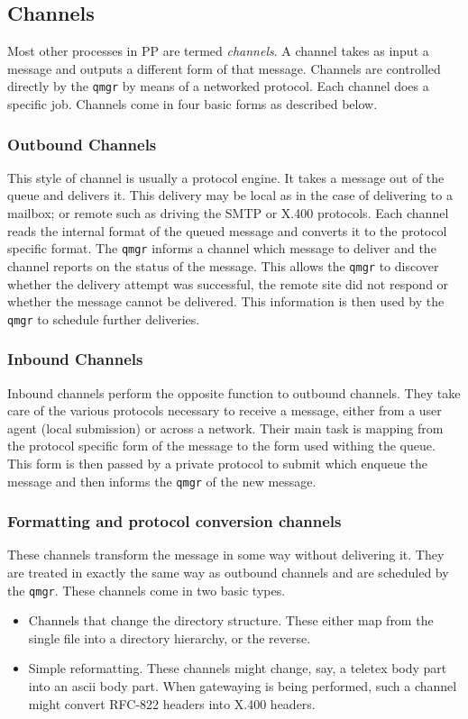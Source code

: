 \subsection{Channels}

Most other processes in PP are termed {\em channels}. A channel takes
as input a message and outputs a different form of that message.
Channels are controlled directly by the \verb|qmgr| by means of a networked
protocol. Each channel does a specific job. Channels come in four
basic forms as described below.

\subsubsection{Outbound Channels}
This style of channel is usually a protocol engine. It takes a message
out of the queue and delivers it. This delivery may be local as in the
case of delivering to a mailbox; or remote such as driving the
SMTP\cite{SMTP} or X.400 protocols. Each channel reads the internal
format of the queued message and converts it to the protocol specific
format. The \verb|qmgr| informs a channel which message to deliver and the
channel reports on the status of the message. This allows the \verb|qmgr| to
discover whether the delivery attempt was successful, the remote site
did not respond or whether the message cannot be delivered. This
information is then used by the \verb|qmgr| to schedule further deliveries.

\subsubsection{Inbound Channels}
Inbound channels perform the opposite function to outbound channels.
They take care of the various protocols necessary to receive a
message, either from a user agent (local submission) or across a
network. Their main task is mapping from the protocol specific form of
the message to the form used withing the queue. This form is then
passed by a private protocol to submit which enqueue the message and
then informs the \verb|qmgr| of the new message.

\subsubsection{Formatting and protocol conversion channels}
These channels transform the message in some way without delivering
it. They are treated in exactly the same way as outbound channels and
are scheduled by the \verb|qmgr|. These channels come in two basic types.
\begin{itemize}
\item	Channels that change the directory structure. These either map
from the single file into a directory hierarchy, or the reverse.

\item	Simple reformatting. These channels might change, say, a teletex
body part into an ascii body part. When gatewaying is being performed,
such a channel might convert RFC-822 headers into X.400 headers.
\end{itemize}

